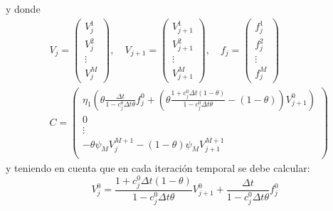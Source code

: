 y donde
\begin{align*}
    &\boxed{
        V_j = \begin{pmatrix}
            V_j^1 \\
            V_j^2 \\
            \vdots \\
            V_j^M
        \end{pmatrix}, \quad
        V_{j+1} = \begin{pmatrix}
            V_{j+1}^1 \\
            V_{j+1}^2 \\
            \vdots \\
            V_{j+1}^M
        \end{pmatrix}, \quad
        f_j = \begin{pmatrix}
            f_j^1 \\
            f_j^2 \\
            \vdots \\
            f_j^M
        \end{pmatrix}
    } \\
    &\boxed{
        C = \begin{pmatrix}
            \eta_1 \left( \theta\frac{\Delta t}{1 - c_j^0 \Delta t \theta} f_j^0 + \left( \theta \frac{1 + c_j^0 \Delta t (1-\theta)}{1 - c_j^0 \Delta t \theta} - (1-\theta) \right) V_{j+1}^{0} \right) \\
            0 \\
            \vdots \\
            -\theta\psi_M V_j^{M+1} - (1-\theta)\psi_M V_{j+1}^{M+1} \\
        \end{pmatrix}
    }
\end{align*}
y teniendo en cuenta que en cada iteración temporal se debe calcular:
\begin{equation*}
    \boxed{V_j^0 = \frac{1 + c_j^0 \Delta t (1-\theta)}{1 - c_j^0 \Delta t \theta} V_{j+1}^0 + \frac{\Delta t}{1 - c_j^0 \Delta t \theta} f_j^0}
\end{equation*}







